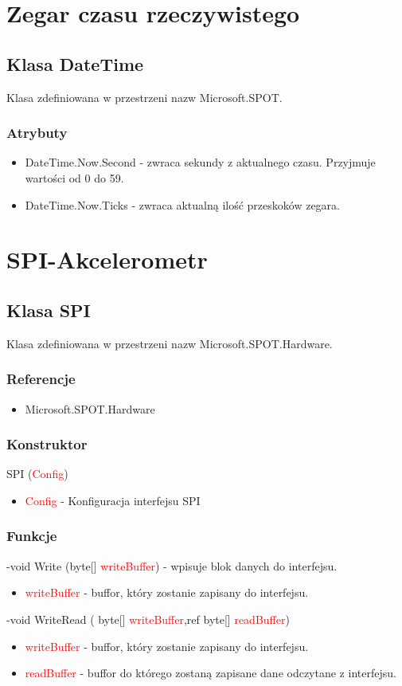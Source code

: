 \documentclass{article}
\begin{document}
\newpage
\section{Zegar czasu rzeczywistego}
\subsection{Klasa DateTime} 
Klasa zdefiniowana w przestrzeni nazw Microsoft.SPOT.
\subsubsection{Atrybuty}
\begin{itemize}
\item DateTime.Now.Second - zwraca sekundy z aktualnego czasu. Przyjmuje wartości od 0 do 59.
\item DateTime.Now.Ticks - zwraca aktualną ilość przeskoków zegara. 
\end{itemize}

\section{SPI-Akcelerometr}
\subsection{Klasa SPI}
Klasa zdefiniowana w przestrzeni nazw Microsoft.SPOT.Hardware. 
\subsubsection{Referencje}
\begin{itemize}
\item Microsoft.SPOT.Hardware
\end{itemize}
\subsubsection{Konstruktor}
SPI (\textcolor{red}{Config})
\begin{itemize}
\item \textcolor{red}{Config} - Konfiguracja interfejsu SPI
\end{itemize}
\subsubsection{Funkcje}
-void Write (byte[] \textcolor{red}{writeBuffer}) - wpisuje blok danych do interfejsu.
\begin{itemize}
\item \textcolor{red}{writeBuffer} - buffor, który zostanie zapisany do interfejsu.
\end{itemize}
-void WriteRead ( byte[] \textcolor{red}{writeBuffer},ref byte[] \textcolor{red}{readBuffer})
\begin{itemize}
\item \textcolor{red}{writeBuffer} - buffor, który zostanie zapisany do interfejsu.
\item \textcolor{red}{readBuffer} - buffor do którego zostaną zapisane dane odczytane z \newline interfejsu.
\end{itemize}
\end{document}
